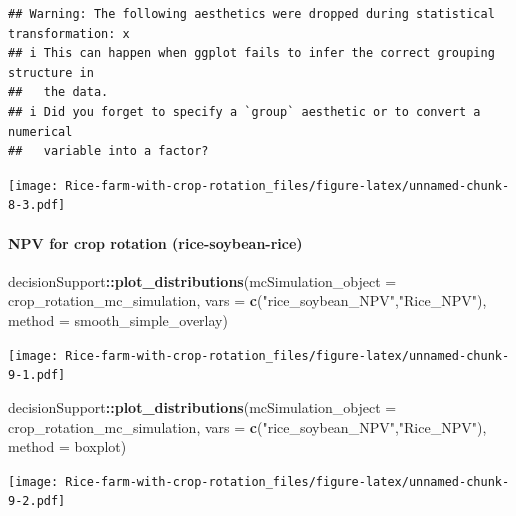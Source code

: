 \documentclass[
]{article}
\newenvironment{Shaded}{\begin{snugshade}}{\end{snugshade}}
\newcommand{\AttributeTok}[1]{\textcolor[rgb]{0.13,0.29,0.53}{#1}}
\newcommand{\FunctionTok}[1]{\textcolor[rgb]{0.13,0.29,0.53}{\textbf{#1}}}
\newcommand{\NormalTok}[1]{#1}
\newcommand{\SpecialCharTok}[1]{\textcolor[rgb]{0.81,0.36,0.00}{\textbf{#1}}}
\newcommand{\StringTok}[1]{\textcolor[rgb]{0.31,0.60,0.02}{#1}}
\begin{document}
\begin{verbatim}
## Warning: The following aesthetics were dropped during statistical transformation: x
## i This can happen when ggplot fails to infer the correct grouping structure in
##   the data.
## i Did you forget to specify a `group` aesthetic or to convert a numerical
##   variable into a factor?
\end{verbatim}

\texttt{[image: Rice-farm-with-crop-rotation\_files/figure-latex/unnamed-chunk-8-3.pdf]}

\hypertarget{npv-for-crop-rotation-rice-soybean-rice}{%
\paragraph{NPV for crop rotation
(rice-soybean-rice)}\label{npv-for-crop-rotation-rice-soybean-rice}}

\begin{Shaded}
\begin{Highlighting}[]
\NormalTok{decisionSupport}\SpecialCharTok{::}\FunctionTok{plot\_distributions}\NormalTok{(}\AttributeTok{mcSimulation\_object =}\NormalTok{ crop\_rotation\_mc\_simulation, }
                                    \AttributeTok{vars =} \FunctionTok{c}\NormalTok{(}\StringTok{"rice\_soybean\_NPV"}\NormalTok{,}\StringTok{"Rice\_NPV"}\NormalTok{),}
                                    \AttributeTok{method =} \StringTok{\textquotesingle{}smooth\_simple\_overlay\textquotesingle{}}\NormalTok{)}
\end{Highlighting}
\end{Shaded}

\texttt{[image: Rice-farm-with-crop-rotation\_files/figure-latex/unnamed-chunk-9-1.pdf]}

\begin{Shaded}
\begin{Highlighting}[]
\NormalTok{decisionSupport}\SpecialCharTok{::}\FunctionTok{plot\_distributions}\NormalTok{(}\AttributeTok{mcSimulation\_object =}\NormalTok{ crop\_rotation\_mc\_simulation, }
                                    \AttributeTok{vars =} \FunctionTok{c}\NormalTok{(}\StringTok{"rice\_soybean\_NPV"}\NormalTok{,}\StringTok{"Rice\_NPV"}\NormalTok{),}
                                    \AttributeTok{method =} \StringTok{\textquotesingle{}boxplot\textquotesingle{}}\NormalTok{)}
\end{Highlighting}
\end{Shaded}

\texttt{[image: Rice-farm-with-crop-rotation\_files/figure-latex/unnamed-chunk-9-2.pdf]}
\end{document}
